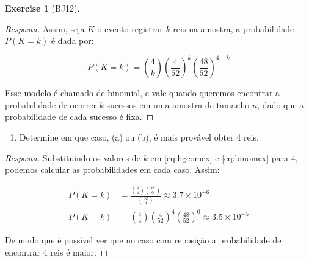 \documentclass[
]{article}
\providecommand{\tightlist}{%
  \setlength{\itemsep}{0pt}\setlength{\parskip}{0pt}}
\theoremstyle{definition}
\theoremstyle{definition}
\theoremstyle{definition}
\newtheorem{exercise}{Exercise}[section]
\theoremstyle{definition}
\theoremstyle{remark}
\begin{document}
\begin{exercise}[BJ12]
\begin{proof}[Resposta]
Assim, seja \(K\) o evento registrar \(k\) reis na amostra, a probabilidade \(P(K=k)\) é dada por:

\begin{equation}
P(K=k) = \binom{4}{k} \left(\frac{4}{52}\right)^{k} \left(\frac{48}{52}\right)^{4-k}
\label{eq:binomex}
\end{equation}

Esse modelo é chamado de binomial, e vale quando queremos encontrar a probabilidade de ocorrer \(k\) sucessos em uma amostra de tamanho \(n\), dado que a probabilidade de cada sucesso é fixa.
\end{proof}

\begin{enumerate}
\def\labelenumi{\alph{enumi})}
\setcounter{enumi}{2}
\tightlist
\item
  Determine em que caso, (a) ou (b), é mais provável obter 4 reis.
\end{enumerate}

\begin{proof}[Resposta]
Substituindo os valores de \(k\) em \eqref{eq:hgeomex} e \eqref{eq:binomex} para 4, podemos calcular as probabilidades em cada caso. Assim:

\begin{align*}
P(K=k) &= \frac{\binom{4}{4}\binom{48}{0}}{\binom{52}{4}} \approx 3.7 \times 10^{-6} \\
P(K=k) &= \binom{4}{4} \left(\frac{4}{52}\right)^{4} \left(\frac{48}{52}\right)^{0} \approx 3.5 \times 10^{-5}
\end{align*}

De modo que é possível ver que no caso com reposição a probabilidade de encontrar 4 reis é maior.
\end{proof}

\end{exercise}
\end{document}
